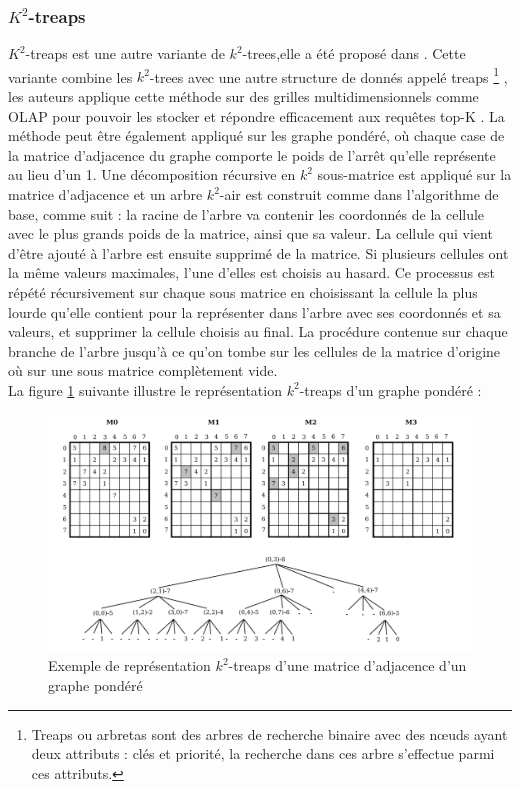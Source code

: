 \subsubsection{$K^2$-treaps }
$K^2$-treaps est une autre variante de $k^2$-trees,elle a été proposé dans \citep{brisaboa2014k}. Cette variante combine les $k^2$-trees avec une autre structure de donnés appelé treaps \footnote{Treaps ou arbretas sont des arbres de recherche binaire avec des nœuds ayant deux attributs : clés et priorité, la recherche dans ces arbre s'effectue parmi ces attributs.} \citep{aragon1989randomized}, les auteurs applique cette méthode sur des grilles multidimensionnels comme OLAP pour pouvoir les stocker et répondre efficacement aux requêtes top-K \citep{badr2013traitement}. La méthode peut être également appliqué sur les graphe pondéré, où chaque case de la matrice d'adjacence du graphe comporte le poids de l'arrêt qu'elle représente au lieu d'un 1.
Une décomposition récursive en $k^2$ sous-matrice est appliqué sur la matrice d'adjacence et un arbre $k^2$-air est construit comme dans l'algorithme de base, comme suit : la racine de l'arbre va contenir les coordonnés de la cellule avec le plus grands poids de la matrice, ainsi que sa valeur. La cellule qui vient d'être ajouté à l'arbre est ensuite supprimé de la matrice. Si plusieurs cellules ont la même valeurs maximales, l'une d'elles est choisis au hasard. Ce processus est répété récursivement sur chaque sous matrice en choisissant la cellule la plus lourde qu'elle contient pour la représenter dans l'arbre avec ses coordonnés et sa valeurs, et supprimer la cellule choisis au final. La procédure contenue sur chaque branche de l'arbre jusqu'à ce qu'on tombe sur les cellules de la matrice d'origine où sur une sous matrice complètement vide.\\
La figure \ref{k2-treaps} suivante illustre le représentation $k^2$-treaps d'un graphe pondéré \citep{badr2013traitement} :

\begin{figure}[H]
\begin{center}
\includegraphics[height=200 pt, width=380 pt]{./ressources/image/k2-treaps.png} 
\end{center}
\caption{Exemple de représentation $k^2$-treaps d'une matrice d'adjacence d'un graphe pondéré}
\label{k2-treaps}
\end{figure}

